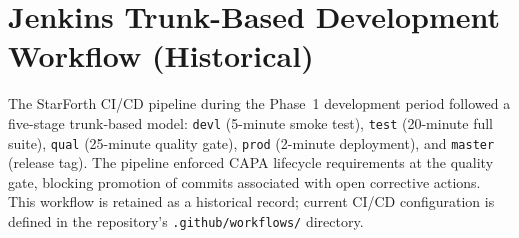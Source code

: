 
\section*{Jenkins Trunk-Based Development Workflow (Historical)}

The StarForth CI/CD pipeline during the Phase~1 development period followed a
five-stage trunk-based model: \texttt{devl} (5-minute smoke test),
\texttt{test} (20-minute full suite), \texttt{qual} (25-minute quality gate),
\texttt{prod} (2-minute deployment), and \texttt{master} (release tag). The
pipeline enforced CAPA lifecycle requirements at the quality gate, blocking
promotion of commits associated with open corrective actions. This workflow is
retained as a historical record; current CI/CD configuration is defined in
the repository's \texttt{.github/workflows/} directory.
